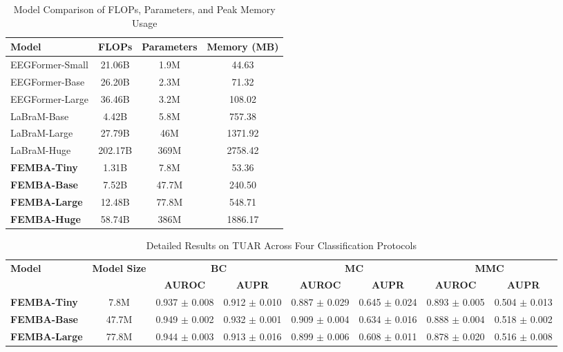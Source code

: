 \begin{table}[b]
    \centering
    \caption{Model Comparison of FLOPs, Parameters, and Peak Memory Usage}
    \label{tab:model_comparison}
    \setlength{\tabcolsep}{6pt} 
    \renewcommand{\arraystretch}{1.2} 
    \small 
    \begin{tabular}{@{}lccc@{}}
    \toprule
    \textbf{Model} & \textbf{FLOPs} & \textbf{Parameters} & \textbf{Memory (MB)} \\ 
    \midrule
    EEGFormer-Small     & 21.06B & 1.9M     & 44.63 \\ 
    EEGFormer-Base      & 26.20B & 2.3M     & 71.32 \\ 
    EEGFormer-Large     & 36.46B & 3.2M     & 108.02 \\ 
    LaBraM-Base         & 4.42B  & 5.8M     & 757.38 \\ 
    LaBraM-Large        & 27.79B & 46M      & 1371.92 \\ 
    LaBraM-Huge         & 202.17B & 369M    & 2758.42 \\ 
    \textbf{FEMBA-Tiny} & 1.31B  & 7.8M     & 53.36 \\ 
    \textbf{FEMBA-Base} & 7.52B  & 47.7M    & 240.50 \\ 
    \textbf{FEMBA-Large} & 12.48B & 77.8M   & 548.71 \\ 
    \textbf{FEMBA-Huge} & 58.74B & 386M     & 1886.17 \\ 
    \bottomrule
    \end{tabular}
\end{table}
\begin{table*}[t]
    \centering
    \caption{Detailed Results on TUAR Across Four Classification Protocols}
    \label{tab:results_tuar}
    \small 
    \begin{tabular}{@{}lccccccc@{}}
    \toprule
    \textbf{Model} & \textbf{Model Size} & \multicolumn{2}{c}{\textbf{BC}} & \multicolumn{2}{c}{\textbf{MC}} & \multicolumn{2}{c}{\textbf{MMC}} \\
    \cmidrule(lr){3-4} \cmidrule(lr){5-6} \cmidrule(lr){7-8}
     &  & \textbf{AUROC} & \textbf{AUPR} & \textbf{AUROC} & \textbf{AUPR} & \textbf{AUROC} & \textbf{AUPR} \\
    \midrule
    \textbf{FEMBA-Tiny}  & 7.8M  
     & 0.937 $\pm$ 0.008 & 0.912 $\pm$ 0.010  
     & 0.887 $\pm$ 0.029 & 0.645 $\pm$ 0.024  
     & 0.893 $\pm$ 0.005 & 0.504 $\pm$ 0.013 
    \\
    \textbf{FEMBA-Base}  & 47.7M 
     & 0.949 $\pm$ 0.002 & 0.932 $\pm$ 0.001 
     & 0.909 $\pm$ 0.004 & 0.634 $\pm$ 0.016 
     & 0.888 $\pm$ 0.004 & 0.518 $\pm$ 0.002 
    \\
    \textbf{FEMBA-Large} & 77.8M  
     & 0.944 $\pm$ 0.003 & 0.913 $\pm$ 0.016 
     & 0.899 $\pm$ 0.006 & 0.608 $\pm$ 0.011 
     & 0.878 $\pm$ 0.020 & 0.516 $\pm$ 0.008 
    \\
    \bottomrule
    \end{tabular}
\end{table*}

